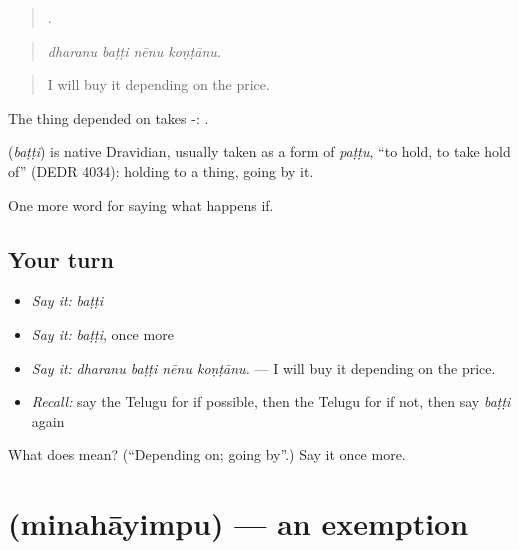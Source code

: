 \begin{quote}
   .
\end{quote}

\begin{quote}
\emph{dharanu baṭṭi nēnu koṇṭānu.}
\end{quote}

\begin{quote}
I will buy it depending on the price.
\end{quote}

The thing depended on takes -:  .

\begin{cousinweb}
\textbf{} (\emph{baṭṭi}) is native Dravidian, usually taken as a form of \emph{paṭṭu}, \textquotedblleft{}to hold, to take hold of\textquotedblright{} (DEDR 4034): holding to a thing, going by it.
\end{cousinweb}

\begin{grammarlens}[title={What you've built}]
One more word for saying what happens if.
\end{grammarlens}

\subsection*{Your turn}
\begin{itemize}
\raggedright
  \item \emph{Say it:} \emph{baṭṭi}
  \item \emph{Say it:} \emph{baṭṭi}, once more
  \item \emph{Say it:} \emph{dharanu baṭṭi nēnu koṇṭānu.} — I will buy it depending on the price.
  \item \emph{Recall:} say the Telugu for if possible, then the Telugu for if not, then say \emph{baṭṭi} again
\end{itemize}

\begin{tcolorbox}[breakable,colback=teal!4,colframe=teal!35!black,title={Before you move on}]
What does  mean? (\textquotedblleft{}Depending on; going by\textquotedblright{}.) Say it once more.
\end{tcolorbox}
\section[\texorpdfstring{\te{మినహాయింపు} (minahāyimpu)}{మినహాయింపు (minahāyimpu)}]{ (minahāyimpu) — an exemption}

